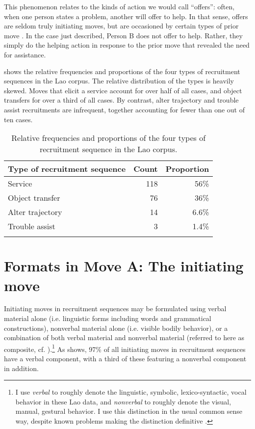 \documentclass[output=paper]{langsci/langscibook}
\begin{document}
This phenomenon relates to the kinds of action we would call “offers”: often, when one person states a problem, another will offer to help. In that sense, offers are seldom truly initiating moves, but are occasioned by certain types of prior move \citep[see also][]{Curl2006}. In the case just described, Person B does not offer to help. Rather, they simply do the helping action in response to the prior move that revealed the need for assistance.

 shows the relative frequencies and proportions of the four types of recruitment sequences in the Lao corpus. The relative distribution of the types is heavily skewed. Moves that elicit a service account for over half of all cases, and object transfers for over a third of all cases. By contrast, alter trajectory and trouble assist recruitments are infrequent, together accounting for fewer than one out of ten cases.

\begin{table}
\begin{tabularx}{0.75\textwidth}{Xrr}
\lsptoprule
Type of recruitment sequence & Count & Proportion\\
\midrule
Service & 118 & 56\%\\
Object transfer & 76 & 36\%\\
Alter trajectory & 14 & 6.6\%\\
Trouble assist & 3 & 1.4\%\\
\lspbottomrule
\end{tabularx}
\caption{Relative frequencies and proportions of the four types of recruitment sequence in the Lao corpus.}
\label{tab:enfield:1}
\end{table}

\section{Formats in Move A: The initiating move}

Initiating moves in recruitment sequences may be formulated using verbal material alone (i.e. linguistic forms including words and grammatical constructions), nonverbal material alone (i.e. visible bodily behavior), or a combination of both verbal material and nonverbal material (referred to here as composite, cf. \citealt{Enfield2009}).\footnote{I use \textit{verbal} to roughly denote the linguistic, symbolic, lexico-syntactic, vocal behavior in these Lao data, and \textit{nonverbal} to roughly denote the visual, manual, gestural behavior. I use this distinction in the usual common sense way, despite known problems making the distinction definitive \citep[see][]{Enfield2009}.} As  shows, 97\% of all initiating moves in recruitment sequences have a verbal component, with a third of these featuring a nonverbal component in addition.
\end{document}
